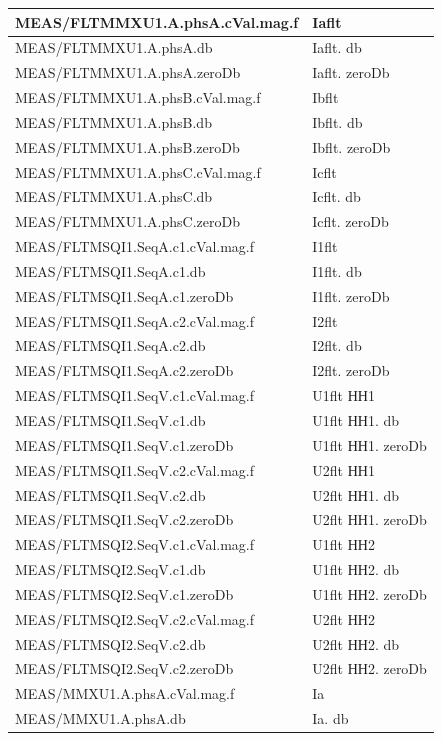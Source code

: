 \begin{longtable}{|>{\raggedright\arraybackslash}m{}|>{\raggedright\arraybackslash}m{}|}
\hline
MEAS/FLTMMXU1.A.phsA.cVal.mag.f & Iaflt \\
\hline
MEAS/FLTMMXU1.A.phsA.db & Iaflt. db \\
\hline
MEAS/FLTMMXU1.A.phsA.zeroDb & Iaflt. zeroDb \\
\hline
MEAS/FLTMMXU1.A.phsB.cVal.mag.f & Ibflt \\
\hline
MEAS/FLTMMXU1.A.phsB.db & Ibflt. db \\
\hline
MEAS/FLTMMXU1.A.phsB.zeroDb & Ibflt. zeroDb \\
\hline
MEAS/FLTMMXU1.A.phsC.cVal.mag.f & Icflt \\
\hline
MEAS/FLTMMXU1.A.phsC.db & Icflt. db \\
\hline
MEAS/FLTMMXU1.A.phsC.zeroDb & Icflt. zeroDb \\
\hline
MEAS/FLTMSQI1.SeqA.c1.cVal.mag.f & I1flt \\
\hline
MEAS/FLTMSQI1.SeqA.c1.db & I1flt. db \\
\hline
MEAS/FLTMSQI1.SeqA.c1.zeroDb & I1flt. zeroDb \\
\hline
MEAS/FLTMSQI1.SeqA.c2.cVal.mag.f & I2flt \\
\hline
MEAS/FLTMSQI1.SeqA.c2.db & I2flt. db \\
\hline
MEAS/FLTMSQI1.SeqA.c2.zeroDb & I2flt. zeroDb \\
\hline
MEAS/FLTMSQI1.SeqV.c1.cVal.mag.f & U1flt НН1 \\
\hline
MEAS/FLTMSQI1.SeqV.c1.db & U1flt НН1. db \\
\hline
MEAS/FLTMSQI1.SeqV.c1.zeroDb & U1flt НН1. zeroDb \\
\hline
MEAS/FLTMSQI1.SeqV.c2.cVal.mag.f & U2flt НН1 \\
\hline
MEAS/FLTMSQI1.SeqV.c2.db & U2flt НН1. db \\
\hline
MEAS/FLTMSQI1.SeqV.c2.zeroDb & U2flt НН1. zeroDb \\
\hline
MEAS/FLTMSQI2.SeqV.c1.cVal.mag.f & U1flt НН2 \\
\hline
MEAS/FLTMSQI2.SeqV.c1.db & U1flt НН2. db \\
\hline
MEAS/FLTMSQI2.SeqV.c1.zeroDb & U1flt НН2. zeroDb \\
\hline
MEAS/FLTMSQI2.SeqV.c2.cVal.mag.f & U2flt НН2 \\
\hline
MEAS/FLTMSQI2.SeqV.c2.db & U2flt НН2. db \\
\hline
MEAS/FLTMSQI2.SeqV.c2.zeroDb & U2flt НН2. zeroDb \\
\hline
MEAS/MMXU1.A.phsA.cVal.mag.f & Ia \\
\hline
MEAS/MMXU1.A.phsA.db & Ia. db \\

\end{longtable}
